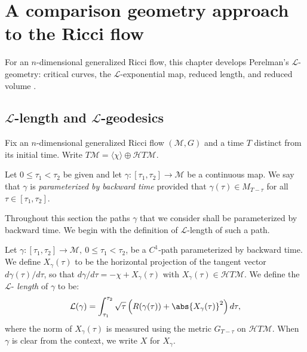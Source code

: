 \chapter{A comparison geometry approach to the Ricci flow}\label{chap:comparison-geometry}
\label{lengthfn}

For an $n$-dimensional generalized Ricci flow, this chapter develops
Perelman's ${\mathcal L}$-geometry: critical curves, the
${\mathcal L}$-exponential map, reduced length, and reduced volume
\cite{Perelman1}.


\section{${\mathcal L}$-length and ${\mathcal L}$-geodesics}

Fix an $n$-dimensional generalized Ricci flow $({\mathcal M},G)$ and
a time $T$ distinct from its initial time. Write
$T{\mathcal M}=\langle\chi\rangle\oplus {\mathcal HT}{\mathcal M}$.


\begin{definition}\label{def:parameterized-by-backward-time}
Let $0\le \tau_1<\tau_2$ be given and let $\gamma\colon
[\tau_1,\tau_2]\to {\mathcal M}$ be a continuous map. We say that
$\gamma$ is {\em parameterized by backward time} provided that $\gamma(\tau)\in M_{T-\tau}$ for all
$\tau\in [\tau_1,\tau_2]$.
\end{definition}


Throughout this section the paths $\gamma$ that we consider shall be
parameterized by backward time. We begin with the definition of
${\mathcal L}$-length of such a path.

\begin{definition}\label{def:l-length}
\label{Llength}
Let  $\gamma\colon [\tau_{1},\tau_{2}]\rightarrow {\mathcal M},\ 0
\le \tau_{1} < \tau_{2}$, be a  $C^{1}$-path parameterized by
backward time. We define $X_\gamma(\tau)$ to be the horizontal
projection of the tangent vector $d\gamma(\tau)/d\tau$, so that
$d\gamma/d\tau=-\chi+X_\gamma(\tau)$ with $X_\gamma(\tau)\in
{\mathcal HT}{\mathcal M}$. We define the $\mathcal{L}$-{\em
length} of $\gamma$ to be:
$$\mathcal{L}(\gamma) = \int_{\tau_{1}}^{\tau_{2}}
\sqrt{\tau}\left(R(\gamma(\tau)) +
\abs{X_\gamma(\tau)}^{2}\right)d\tau,$$
where the norm of $X_\gamma(\tau)$ is measured using the metric
$G_{T-\tau}$ on ${\mathcal HT}{\mathcal M}$. When $\gamma$ is clear
from the context, we write $X$ for $X_\gamma$.
\end{definition}



